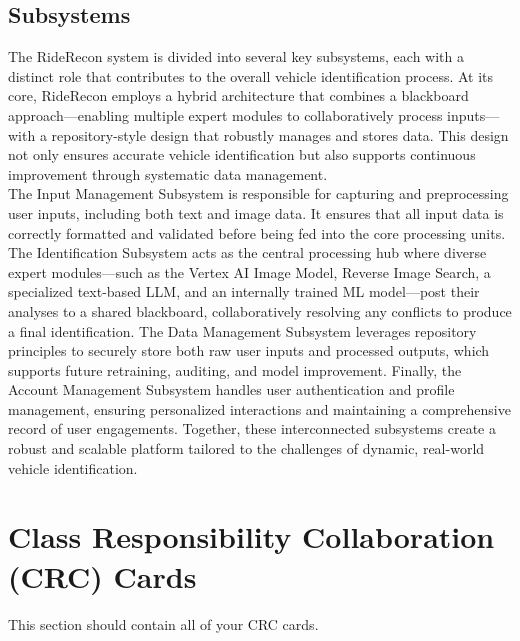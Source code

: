 \documentclass[]{article}
\begin{document}

\subsection{Subsystems}
\label{sub:subsystems}
The RideRecon system is divided into several key subsystems, each with a distinct role that contributes to the overall vehicle identification process. At its core, RideRecon employs a hybrid architecture that combines a blackboard approach—enabling multiple expert modules to collaboratively process inputs—with a repository-style design that robustly manages and stores data. This design not only ensures accurate vehicle identification but also supports continuous improvement through systematic data management.\\

\noindent The Input Management Subsystem is responsible for capturing and preprocessing user inputs, including both text and image data. It ensures that all input data is correctly formatted and validated before being fed into the core processing units. The Identification Subsystem acts as the central processing hub where diverse expert modules—such as the Vertex AI Image Model, Reverse Image Search, a specialized text-based LLM, and an internally trained ML model—post their analyses to a shared blackboard, collaboratively resolving any conflicts to produce a final identification. The Data Management Subsystem leverages repository principles to securely store both raw user inputs and processed outputs, which supports future retraining, auditing, and model improvement. Finally, the Account Management Subsystem handles user authentication and profile management, ensuring personalized interactions and maintaining a comprehensive record of user engagements. Together, these interconnected subsystems create a robust and scalable platform tailored to the challenges of dynamic, real-world vehicle identification.


	
\section{Class Responsibility Collaboration (CRC) Cards}
\label{sec:class_responsibility_collaboration_crc_cards}
This section should contain all of your CRC cards.
\end{document}
